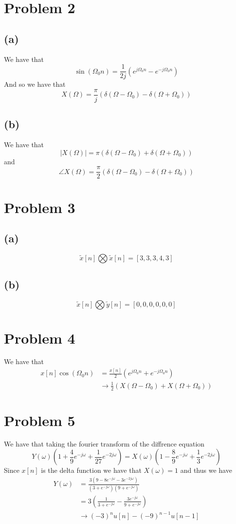 \section*{Problem 2}
\subsection*{(a)}
We have that 
$$\sin(\Omega_0n)=\frac{1}{2j}\left(e^{j\Omega_0n}-e^{-j\Omega_0n}\right)$$
And so we have that 
$$X(\Omega)=\frac{\pi}{j}\left(\delta(\Omega-\Omega_0)-\delta(\Omega+\Omega_0)\right)$$
\subsection*{(b)}
We have that
$$|X(\Omega)|=\pi\left(\delta(\Omega-\Omega_0)+\delta(\Omega+\Omega_0)\right)$$
and 
$$\angle X(\Omega)=\frac{\pi}{2}\left(\delta(\Omega-\Omega_0)-\delta(\Omega+\Omega_0)\right)$$
\section*{Problem 3}
\subsection*{(a)}
$$\tilde{x}[n]\bigotimes\tilde{x}[n]=[3, 3, 3, 4, 3]$$
\subsection*{(b)}
$$\tilde{x}[n]\bigotimes \tilde{y}[n]=[0, 0, 0, 0, 0, 0]$$
\section*{Problem 4}
We have that 
\begin{align*}
    x[n]\cos(\Omega_0 n)&=\frac{x[n]}{2}\left(e^{j\Omega_0 n}+e^{-j\Omega_0 n}\right)\\
    &\to \frac{1}{2}\left(X(\Omega-\Omega_0)+X(\Omega+\Omega_0)\right)
\end{align*}
\section*{Problem 5}
We have that taking the fourier transform of the diffrence equation
$$Y(\omega)(1+\frac{4}{9}e^{-j\omega}+\frac{1}{27}e^{-2j\omega})=X(\omega)(1-\frac{8}{9}e^{-j\omega}+\frac{1}{3}e^{-2j\omega})$$
Since $x[n]$ is the delta function we have that 
$X(\omega)=1$ and thus we have
\begin{align*}
    Y(\omega)&=\frac{3(9-8e^{-j\omega}-3e^{-2j\omega})}{(3+e^{-j\omega})(9+e^{-j\omega})}\\
    &=3\left(\frac{1}{3+e^{-j\omega}}-\frac{3e^{-j\omega}}{9+e^{-j\omega}}\right)\\
    &\to \boxed{(-3)^{n}u[n]-(-9)^{n-1}u[n-1]}
\end{align*}
